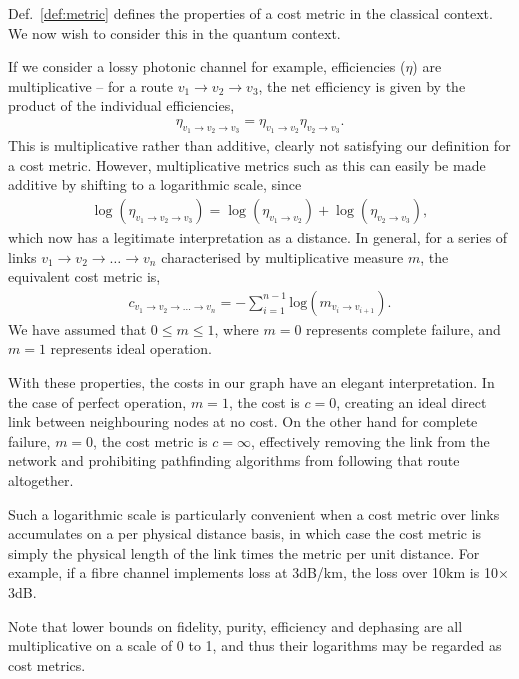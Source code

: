 \documentclass[aps,rmp,twocolumn,amsmath,amssymb,nofootinbib,superscriptaddress]{revtex4}
\begin{document}
Def.~\ref{def:metric} defines the properties of a cost metric in the classical context. We now wish to consider this in the quantum context.

If we consider a lossy photonic channel for example, efficiencies ($\eta$) are multiplicative -- for a route \mbox{$v_1\to v_2\to v_3$}, the net efficiency is given by the product of the individual efficiencies, \begin{align}
\eta_{v_1\to v_2 \to v_3} = \eta_{v_1\to v_2} \eta_{v_2\to v_3}.
\end{align}
This is multiplicative rather than additive, clearly not satisfying our definition for a cost metric. However, multiplicative metrics such as this can easily be made additive by shifting to a logarithmic scale, since
\begin{align}
\log(\eta_{v_1\to v_2\to v_3}) = \log(\eta_{v_1\to v_2}) + \log(\eta_{v_2\to v_3}),
\end{align}
which now has a legitimate interpretation as a distance. In general, for a series of links \mbox{$v_1\to v_2 \to \dots \to v_n$} characterised by multiplicative measure $m$, the equivalent cost metric is,
\begin{align} \label{eq:dist_log}
c_{v_1\to v_2 \to \dots \to v_n} = -\sum_{i=1}^{n-1} \mathrm{log}(m_{v_i\to v_{i+1}}).
\end{align}
We have assumed that \mbox{$0\leq m \leq 1$}, where \mbox{$m=0$} represents complete failure, and \mbox{$m=1$} represents ideal operation.

With these properties, the costs in our graph have an elegant interpretation. In the case of perfect operation, \mbox{$m=1$}, the cost is \mbox{$c=0$}, creating an ideal direct link between neighbouring nodes at no cost. On the other hand for complete failure, \mbox{$m=0$}, the cost metric is \mbox{$c=\infty$}, effectively removing the link from the network and prohibiting pathfinding algorithms from following that route altogether.

Such a logarithmic scale is particularly convenient when a cost metric over links accumulates on a per physical distance basis, in which case the cost metric is simply the physical length of the link times the metric per unit distance. For example, if a fibre channel implements loss at 3dB/km, the loss over 10km is 10$\times$3dB.

Note that lower bounds on fidelity, purity, efficiency and dephasing are all multiplicative on a scale of 0 to 1, and thus their logarithms may be regarded as cost metrics.
\end{document}
